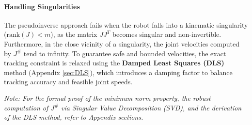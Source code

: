 \paragraph{Handling Singularities}
The pseudoinverse approach fails when the robot falls into a kinematic singularity 
($\text{rank}(J) < m$), as the matrix $JJ^T$ becomes singular and non-invertible. 
Furthermore, in the close vicinity of a singularity, the joint velocities computed by $J^\#$ tend to infinity. 
To guarantee safe and bounded velocities, the exact tracking constraint is relaxed using the \textbf{Damped Least Squares (DLS)} method (Appendix \ref{sec:DLS}), 
which introduces a damping factor to balance tracking accuracy and feasible joint speeds.

\medskip
\textit{Note: For the formal proof of the minimum norm property, the robust computation of $J^\#$ via Singular Value Decomposition (SVD), and the derivation of the DLS method, refer to Appendix sections.}
